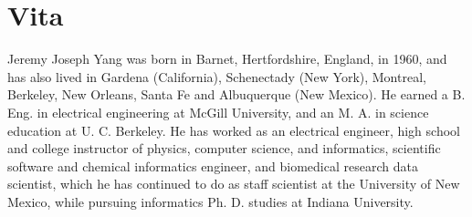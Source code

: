 \chapter*{Vita}

\doublespacing

Jeremy Joseph Yang was born in Barnet, Hertfordshire, England, in 1960, and has also lived in Gardena (California), Schenectady (New York), Montreal, Berkeley, New Orleans, Santa Fe and Albuquerque (New Mexico). He earned a B. Eng. in electrical engineering at McGill University, and an M. A. in science education at U. C. Berkeley. He has worked as an electrical engineer, high school and college instructor of physics, computer science, and informatics, scientific software and chemical informatics engineer, and biomedical research data scientist, which he has continued to do as staff scientist at the University of New Mexico, while pursuing informatics Ph. D. studies at Indiana University. 

